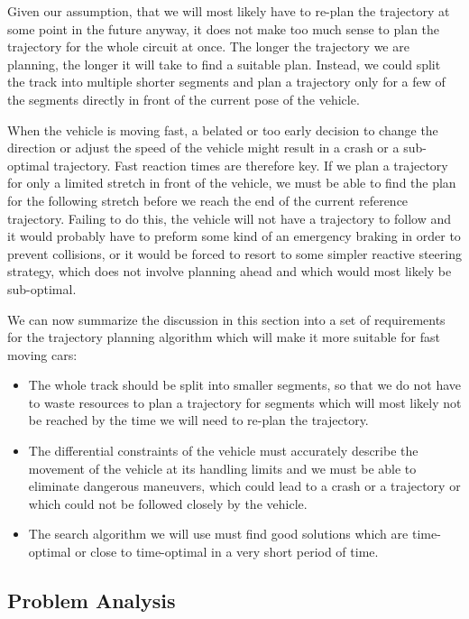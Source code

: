 Given our assumption, that we will most likely have to re-plan the trajectory at some point in the future anyway, it does not make too much sense to plan the trajectory for the whole circuit at once. The longer the trajectory we are planning, the longer it will take to find a suitable plan. Instead, we could split the track into multiple shorter segments and plan a trajectory only for a few of the segments directly in front of the current pose of the vehicle.

When the vehicle is moving fast, a belated or too early decision to change the direction or adjust the speed of the vehicle might result in a crash or a sub-optimal trajectory. Fast reaction times are therefore key. If we plan a trajectory for only a limited stretch in front of the vehicle, we must be able to find the plan for the following stretch before we reach the end of the current reference trajectory. Failing to do this, the vehicle will not have a trajectory to follow and it would probably have to preform some kind of an emergency braking in order to prevent collisions, or it would be forced to resort to some simpler reactive steering strategy, which does not involve planning ahead and which would most likely be sub-optimal.

We can now summarize the discussion in this section into a set of requirements for the trajectory planning algorithm which will make it more suitable for fast moving cars:

\begin{itemize}
	\item The whole track should be split into smaller segments, so that we do not have to waste resources to plan a trajectory for segments which will most likely not be reached by the time we will need to re-plan the trajectory.
	\item The differential constraints of the vehicle must accurately describe the movement of the vehicle at its handling limits and we must be able to eliminate dangerous maneuvers, which could lead to a crash or a trajectory or which could not be followed closely by the vehicle.
	\item The search algorithm we will use must find good solutions which are time-optimal or close to time-optimal in a very short period of time.
\end{itemize}

\subsection{Problem Analysis}

